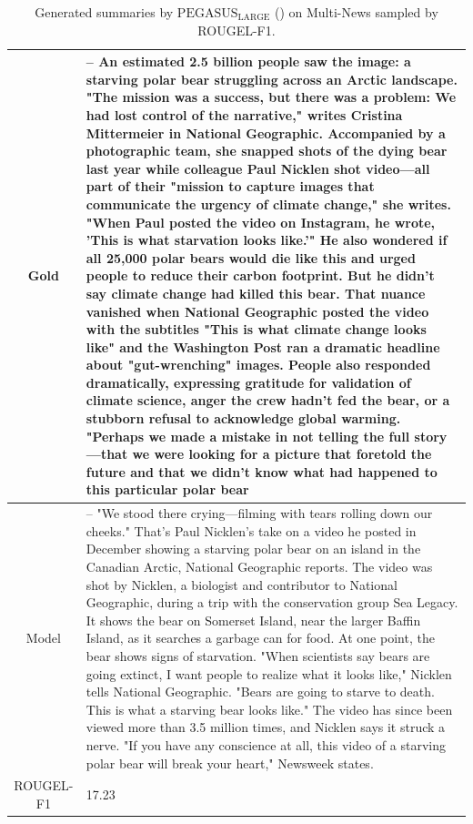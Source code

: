 \begin{table}[bth!]
\begin{tabular}{c|p{}}
\\ \hline
Gold & 
– An estimated 2.5 billion people saw the image: a starving polar bear struggling across an Arctic landscape. "The mission was a success, but there was a problem: We had lost control of the narrative," writes Cristina Mittermeier in National Geographic. Accompanied by a photographic team, she snapped shots of the dying bear last year while colleague Paul Nicklen shot video—all part of their "mission to capture images that communicate the urgency of climate change," she writes. "When Paul posted the video on Instagram, he wrote, 'This is what starvation looks like.'" He also wondered if all 25,000 polar bears would die like this and urged people to reduce their carbon footprint. But he didn't say climate change had killed this bear. That nuance vanished when National Geographic posted the video with the subtitles "This is what climate change looks like" and the Washington Post ran a dramatic headline about "gut-wrenching" images. People also responded dramatically, expressing gratitude for validation of climate science, anger the crew hadn't fed the bear, or a stubborn refusal to acknowledge global warming. "Perhaps we made a mistake in not telling the full story—that we were looking for a picture that foretold the future and that we didn’t know what had happened to this particular polar bear
\\ \hline
Model & 
– "We stood there crying—filming with tears rolling down our cheeks." That's Paul Nicklen's take on a video he posted in December showing a starving polar bear on an island in the Canadian Arctic, National Geographic reports. The video was shot by Nicklen, a biologist and contributor to National Geographic, during a trip with the conservation group Sea Legacy. It shows the bear on Somerset Island, near the larger Baffin Island, as it searches a garbage can for food. At one point, the bear shows signs of starvation. "When scientists say bears are going extinct, I want people to realize what it looks like," Nicklen tells National Geographic. "Bears are going to starve to death. This is what a starving bear looks like." The video has since been viewed more than 3.5 million times, and Nicklen says it struck a nerve. "If you have any conscience at all, this video of a starving polar bear will break your heart," Newsweek states.
\\ \hline
ROUGEL-F1 & 
17.23
\\ \hline
\end{tabular}
\caption{Generated summaries by $\text{PEGASUS}_{\text{LARGE}}$ (\gnews) on Multi-News sampled by ROUGEL-F1.}
\end{table}
